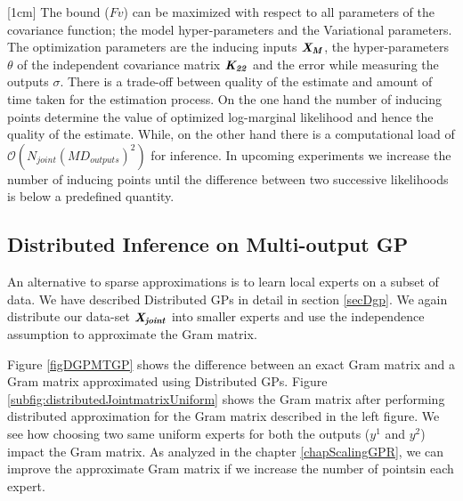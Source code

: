 [1cm]
The bound ($Fv$) can be maximized with respect to all parameters of the covariance function; the model hyper-parameters and the Variational parameters. The optimization parameters are the inducing inputs \(\bm{\mathit{X_{M}}}\), the hyper-parameters \(\theta\) of the independent covariance matrix \(\bm{\mathit{K_{22}}}\) and the error while measuring the outputs \(\sigma\). There is a trade-off between quality of the estimate and amount of time taken for the estimation process. On the one hand the number of inducing points determine the value of optimized log-marginal likelihood and hence the quality of the estimate. While, on the other hand there is a computational load of \(\mathcal{O}\left ( N_{joint}(MD_{outputs})^{2} \right )\) for inference. In upcoming experiments we increase the number of inducing points until the difference between two successive likelihoods is below a predefined quantity.   

\subsection{Distributed Inference on Multi-output GP}\label{sec:dMOGP}
An alternative to sparse approximations is to learn local experts on a subset of data. We have described Distributed GPs in detail in section \ref{secDgp}. We again distribute our data-set $\bm{\mathit{X_{joint}}}$ into smaller experts and use the independence assumption to approximate the Gram matrix.  


Figure \ref{figDGPMTGP} shows the difference between an exact Gram matrix and a Gram matrix approximated using Distributed GPs. Figure \ref{subfig:distributedJointmatrixUniform} shows the Gram matrix after performing distributed approximation for the Gram matrix described in the left figure. We see how choosing two same uniform experts for both the outputs ($y^1$ and $y^2$) impact the Gram matrix. As analyzed in the chapter \ref{chapScalingGPR}, we can improve the approximate Gram matrix if we increase the number of pointsin each expert. 

